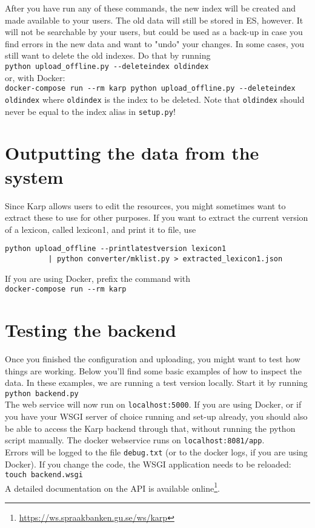 \documentclass[
12pt, %
a4paper, %
oneside, %
headinclude,footinclude, %
BCOR0mm, %
]{scrartcl}
\begin{document}
After you have run any of these commands, the new index will be created and
made available to your users. The old data will still be stored in ES, however. It will not
be searchable by your users, but could be used as a back-up in case you find
errors in the new data and want to "undo" your changes. In some  cases, you
still want to delete the old indexes.
Do that by running\\
\verb|python upload_offline.py --deleteindex oldindex|\\
or, with Docker:\\
\verb|docker-compose run --rm karp python upload_offline.py --deleteindex oldindex|
where \verb|oldindex| is the index to be deleted. Note that \verb|oldindex|
should never be equal to the index alias in \verb|setup.py|!



\section{Outputting the data from the system}
\label{sec:output}
Since Karp allows users to edit the resources, you might sometimes want to extract
these to use for other purposes.
If you want to extract the current version of a lexicon, called lexicon1, and print it to
file, use
\begin{verbatim}
python upload_offline --printlatestversion lexicon1
          | python converter/mklist.py > extracted_lexicon1.json
\end{verbatim}
If you are using Docker, prefix the command with\\
\verb|docker-compose run --rm karp|

\section{Testing the backend}
Once you finished the configuration and uploading, you might want to
test how things are working. Below
you'll find some basic examples of how to inspect the data. In these examples,
we are running a test version locally. Start it by running \\
\verb|python backend.py|\\
The web service will now run on
\verb|localhost:5000|.
If you are using Docker, or if you have your WSGI server of choice running and
set-up already, you should
also be able to access the Karp backend through that, without running the python
script manually. The docker webservice runs on \verb|localhost:8081/app|.\\
Errors will be logged to the file \verb|debug.txt| (or to the docker logs, if
you are using Docker).
If you change the code, the WSGI application needs to be reloaded:\\
\verb|touch backend.wsgi|
\\A detailed documentation on the API is available online\footnote{%
\url{https://ws.spraakbanken.gu.se/ws/karp}}.\\
\end{document}
